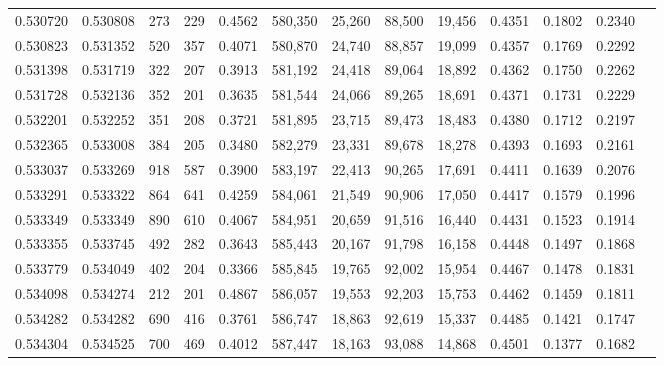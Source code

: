 \begin{tabular}{rrrrrrrrrrrrr}
0.530720 & 0.530808 &    273 &   229 &                                     0.4562 & 580,350 &  25,260 &  88,500 &  19,456 & 0.4351 & 0.1802 & 0.2340 \\
0.530823 & 0.531352 &    520 &   357 &                                     0.4071 & 580,870 &  24,740 &  88,857 &  19,099 & 0.4357 & 0.1769 & 0.2292 \\
0.531398 & 0.531719 &    322 &   207 &                                     0.3913 & 581,192 &  24,418 &  89,064 &  18,892 & 0.4362 & 0.1750 & 0.2262 \\
0.531728 & 0.532136 &    352 &   201 &                                     0.3635 & 581,544 &  24,066 &  89,265 &  18,691 & 0.4371 & 0.1731 & 0.2229 \\
0.532201 & 0.532252 &    351 &   208 &                                     0.3721 & 581,895 &  23,715 &  89,473 &  18,483 & 0.4380 & 0.1712 & 0.2197 \\
0.532365 & 0.533008 &    384 &   205 &                                     0.3480 & 582,279 &  23,331 &  89,678 &  18,278 & 0.4393 & 0.1693 & 0.2161 \\
0.533037 & 0.533269 &    918 &   587 &                                     0.3900 & 583,197 &  22,413 &  90,265 &  17,691 & 0.4411 & 0.1639 & 0.2076 \\
0.533291 & 0.533322 &    864 &   641 &                                     0.4259 & 584,061 &  21,549 &  90,906 &  17,050 & 0.4417 & 0.1579 & 0.1996 \\
0.533349 & 0.533349 &    890 &   610 &                                     0.4067 & 584,951 &  20,659 &  91,516 &  16,440 & 0.4431 & 0.1523 & 0.1914 \\
0.533355 & 0.533745 &    492 &   282 &                                     0.3643 & 585,443 &  20,167 &  91,798 &  16,158 & 0.4448 & 0.1497 & 0.1868 \\
0.533779 & 0.534049 &    402 &   204 &                                     0.3366 & 585,845 &  19,765 &  92,002 &  15,954 & 0.4467 & 0.1478 & 0.1831 \\
0.534098 & 0.534274 &    212 &   201 &                                     0.4867 & 586,057 &  19,553 &  92,203 &  15,753 & 0.4462 & 0.1459 & 0.1811 \\
0.534282 & 0.534282 &    690 &   416 &                                     0.3761 & 586,747 &  18,863 &  92,619 &  15,337 & 0.4485 & 0.1421 & 0.1747 \\
0.534304 & 0.534525 &    700 &   469 &                                     0.4012 & 587,447 &  18,163 &  93,088 &  14,868 & 0.4501 & 0.1377 & 0.1682 \\

\end{tabular}

